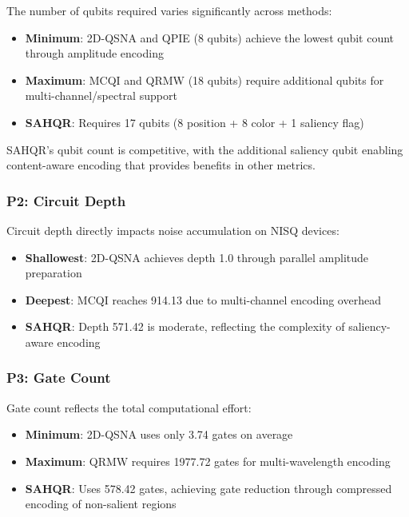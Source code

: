 \documentclass[pdflatex,sn-mathphys-num,Numbered]{sn-jnl}
\theoremstyle{thmstyleone}
\theoremstyle{thmstyletwo}
\theoremstyle{thmstylethree}
\begin{document}
The number of qubits required varies significantly across methods:

\begin{itemize}
\item \textbf{Minimum}: 2D-QSNA and QPIE (8 qubits) achieve the lowest qubit count through amplitude encoding
\item \textbf{Maximum}: MCQI and QRMW (18 qubits) require additional qubits for multi-channel/spectral support
\item \textbf{SAHQR}: Requires 17 qubits (8 position + 8 color + 1 saliency flag)
\end{itemize}

SAHQR's qubit count is competitive, with the additional saliency qubit enabling content-aware encoding that provides benefits in other metrics.

\subsubsection{P2: Circuit Depth}

Circuit depth directly impacts noise accumulation on NISQ devices:

\begin{itemize}
\item \textbf{Shallowest}: 2D-QSNA achieves depth 1.0 through parallel amplitude preparation
\item \textbf{Deepest}: MCQI reaches 914.13 due to multi-channel encoding overhead
\item \textbf{SAHQR}: Depth 571.42 is moderate, reflecting the complexity of saliency-aware encoding
\end{itemize}

\subsubsection{P3: Gate Count}

Gate count reflects the total computational effort:

\begin{itemize}
\item \textbf{Minimum}: 2D-QSNA uses only 3.74 gates on average
\item \textbf{Maximum}: QRMW requires 1977.72 gates for multi-wavelength encoding
\item \textbf{SAHQR}: Uses 578.42 gates, achieving gate reduction through compressed encoding of non-salient regions
\end{itemize}
\end{document}
